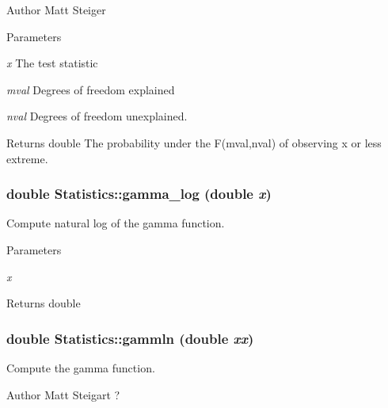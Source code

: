 \begin{DoxyAuthor}{Author}
Matt Steiger
\end{DoxyAuthor}

\begin{DoxyParams}{Parameters}
\item[{\em x}]The test statistic \item[{\em mval}]Degrees of freedom explained \item[{\em nval}]Degrees of freedom unexplained. \end{DoxyParams}
\begin{DoxyReturn}{Returns}
double The probability under the F(mval,nval) of observing x or less extreme. 
\end{DoxyReturn}
\hypertarget{classStatistics_a7802e672039a0e6d879333ed83bb53a4}{
\subsubsection[{gamma\_\-log}]{\setlength{\rightskip}{0pt plus 5cm}double Statistics::gamma\_\-log (double {\em x})}}
\label{classStatistics_a7802e672039a0e6d879333ed83bb53a4}
Compute natural log of the gamma function.


\begin{DoxyParams}{Parameters}
\item[{\em x}]\end{DoxyParams}
\begin{DoxyReturn}{Returns}
double 
\end{DoxyReturn}
\hypertarget{classStatistics_ad1340b8f52570bb39f6fae2a565e4a90}{
\subsubsection[{gammln}]{\setlength{\rightskip}{0pt plus 5cm}double Statistics::gammln (double {\em xx})}}
\label{classStatistics_ad1340b8f52570bb39f6fae2a565e4a90}
Compute the gamma function.

\begin{DoxyAuthor}{Author}
Matt Steigart ?
\end{DoxyAuthor}

